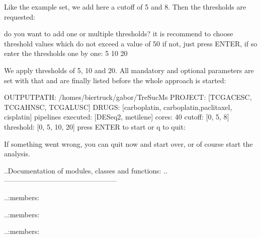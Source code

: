 \documentclass[letterpaper,10pt,english]{sphinxmanual}
\begin{document}
\sphinxAtStartPar
Like the example set, we add here a cutoff of 5 and 8. Then the thresholds are
requested:

\begin{sphinxVerbatim}[commandchars=\\\{\}]
do you want to add one or multiple thresholds?
it is recommend to choose threshold values which do not exceed a value of 50
if not, just press ENTER, if so enter the thresholds one by one:
5
10
20
\end{sphinxVerbatim}

\sphinxAtStartPar
We apply thresholds of 5, 10 and 20. All mandatory and optional parameters are
set with that and are finally listed before the whole approach is started:

\begin{sphinxVerbatim}[commandchars=\\\{\}]
OUTPUT\PYGZus{}PATH:             /homes/biertruck/gabor/TreSucMs
PROJECT:                 [\PYGZsq{}TCGA\PYGZhy{}CESC\PYGZsq{}, \PYGZsq{}TCGA\PYGZhy{}HNSC\PYGZsq{}, \PYGZsq{}TCGA\PYGZhy{}LUSC\PYGZsq{}]
DRUGS:                   [\PYGZsq{}carboplatin\PYGZsq{}, \PYGZsq{}carboplatin,paclitaxel\PYGZsq{}, \PYGZsq{}cisplatin\PYGZsq{}]
pipelines executed:      [\PYGZsq{}DESeq2\PYGZsq{}, \PYGZsq{}metilene\PYGZsq{}]
cores:                  40
cutoff:                 [0, 5, 8]
threshold:              [0, 5, 10, 20]
press ENTER to start or q to quit:
\end{sphinxVerbatim}

\sphinxAtStartPar
If something went wrong, you can quit now and start over, or of course start the analysis.

\sphinxAtStartPar
..Documentation of modules, classes and functions:
..————————————————
\begin{description}
\sphinxAtStartPar
..:members:

\sphinxAtStartPar
..:members:

\sphinxAtStartPar
..:members:

\end{description}



\renewcommand{\indexname}{Index}
\printindex
\end{document}
